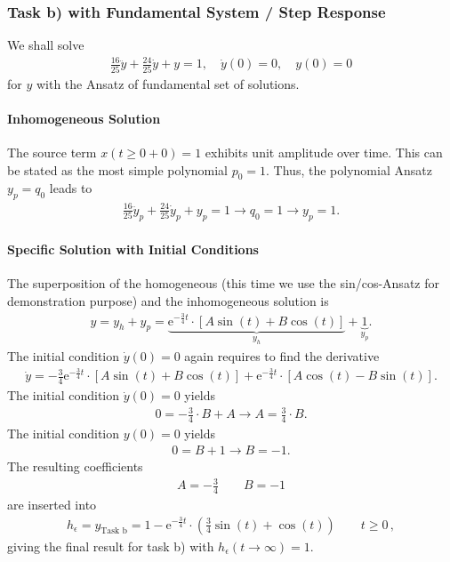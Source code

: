 \documentclass[11pt,a4paper,DIV=12]{scrartcl}
\begin{document}
\subsubsection{Task b) with Fundamental System / Step Response}
We shall solve
\begin{align}
\frac{16}{25} \ddot{y} + \frac{24}{25} \dot{y} + y = 1, \quad
\dot{y}(0) = 0,\quad y(0)=0
\end{align}
for $y$ with the Ansatz of fundamental set of solutions.

\paragraph{Inhomogeneous Solution}
The source term $x(t\geq 0+0)=1$ exhibits unit
amplitude over time. This can be stated as the most simple polynomial $p_0=1$.
Thus, the polynomial Ansatz $y_p = q_0$ leads to
\begin{align}
\frac{16}{25} \ddot{y}_p + \frac{24}{25} \dot{y}_p + y_p = 1
\rightarrow q_0 = 1 \rightarrow  y_p = 1.
\end{align}

\paragraph{Specific Solution with Initial Conditions}
The superposition of the homogeneous (this time we use the sin/cos-Ansatz
 for demonstration purpose) and the inhomogeneous
solution is
\begin{align}
\label{eq:SpecificyTaskb}
y = y_h + y_p = \underbrace{
\mathrm{e}^{-\frac{3}{4} t} \cdot
\left[ A \sin(t) + B  \cos(t)\right]}_{y_h} +\underbrace{1}_{y_p}.
\end{align}
The initial condition $\dot{y}(0) = 0$ again requires to find the derivative
\begin{align}
\dot{y}
=
-\frac{3}{4}\mathrm{e}^{-\frac{3}{4} t} \cdot
\left[ A \sin(t) + B \cos(t)\right]
+
\mathrm{e}^{-\frac{3}{4} t} \cdot
\left[ A \cos(t)  - B \sin(t)\right].
\end{align}
The initial condition $\dot{y}(0) = 0$ yields
\begin{align}
0 = -\frac{3}{4}\cdot B + A \rightarrow A = \frac{3}{4}\cdot B.
\end{align}
The initial condition ${y}(0) = 0$ yields
\begin{align}
0 = B  + 1 \rightarrow B = -1.
\end{align}
The resulting coefficients
\begin{align}
A = -\frac{3}{4}\qquad B = -1
\end{align}
are inserted into 
\begin{align}
\label{eq:stepResponse}
\boxed{
h_\epsilon = y_\text{Task b} =
1 - \mathrm{e}^{-\frac{3}{4} t} \cdot
\left(\frac{3}{4} \sin(t) + \cos(t)\right) \qquad t \geq 0
}\,,
\end{align}
giving the final result for task b) with $h_\epsilon(t\to\infty) = 1$.
\end{document}
